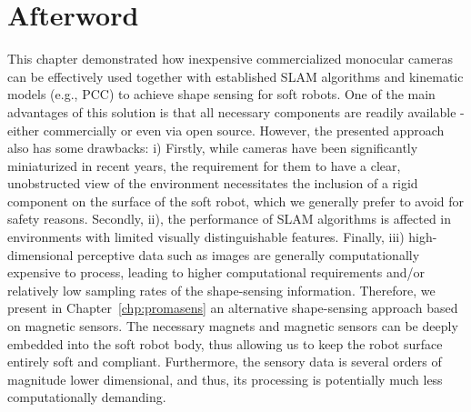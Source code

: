 \section{Afterword}
This chapter demonstrated how inexpensive commercialized monocular cameras can be effectively used together with established \gls{SLAM} algorithms and kinematic models (e.g., \gls{PCC}) to achieve shape sensing for soft robots. One of the main advantages of this solution is that all necessary components are readily available - either commercially or even via open source. However, the presented approach also has some drawbacks: 
i) Firstly, while cameras have been significantly miniaturized in recent years, the requirement for them to have a clear, unobstructed view of the environment necessitates the inclusion of a rigid component on the surface of the soft robot, which we generally prefer to avoid for safety reasons. 
Secondly, ii), the performance of \gls{SLAM} algorithms is affected in environments with limited visually distinguishable features.
Finally, iii) high-dimensional perceptive data such as images are generally computationally expensive to process, leading to higher computational requirements and/or relatively low sampling rates of the shape-sensing information.
Therefore, we present in Chapter~\ref{chp:promasens} an alternative shape-sensing approach based on magnetic sensors. The necessary magnets and magnetic sensors can be deeply embedded into the soft robot body, thus allowing us to keep the robot surface entirely soft and compliant. Furthermore, the sensory data is several orders of magnitude lower dimensional, and thus, its processing is potentially much less computationally demanding.